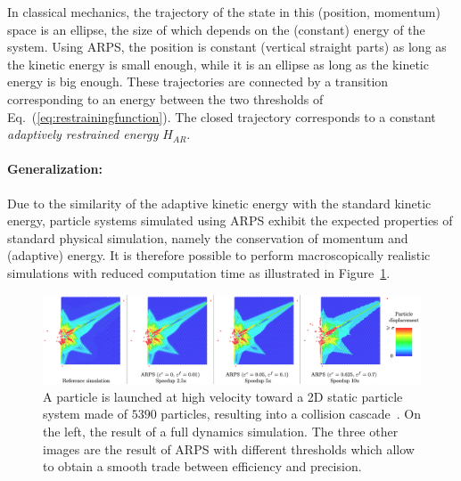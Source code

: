 In classical mechanics, the trajectory of the state in this (position, momentum) space is an ellipse, the size of which depends on the (constant) energy of the system.
Using ARPS, the position is constant (vertical straight parts) as long as the kinetic energy is small enough, while it is an ellipse as long as the kinetic energy is big enough.
These trajectories are connected by a transition corresponding to an energy between the two thresholds of Eq.~(\ref{eq:restrainingfunction}).
The closed trajectory corresponds to a constant \textit{adaptively restrained energy} $H_{AR}$.

\paragraph*{Generalization:}
Due to the similarity of the adaptive kinetic energy with the standard kinetic energy, particle systems simulated using ARPS exhibit the expected properties of standard physical simulation, namely the conservation of momentum and (adaptive) energy. It is therefore possible to perform macroscopically realistic simulations with reduced computation time as illustrated in Figure~\ref{fig:cascadeCollision}.

\begin{figure}[h!]
	\centering
	\includegraphics[width=1.0\linewidth]{images/arps-vriphys2013/ARPS_Collision_Artemova.png}
	\caption[ARPS: Collision Cascade from \cite{Artemova2012}]{\label{fig:cascadeCollision} 
		A particle is launched at high velocity toward a 2D static particle system made of $5390$ particles, resulting into a collision cascade~\cite{Artemova2012}. 
		On the left, the result of a full dynamics simulation. 
		The three other images are the result of ARPS with different thresholds which allow to obtain a smooth trade between efficiency and precision.}
\end{figure}

